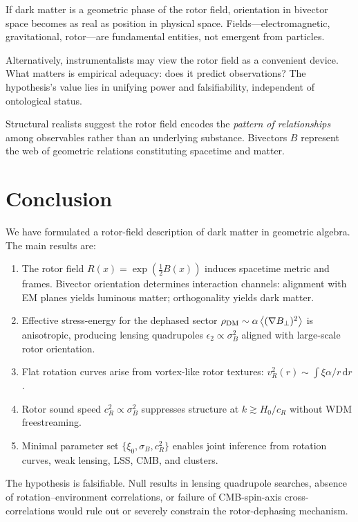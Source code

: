 \documentclass[11pt,a4paper]{article}
\numberwithin{equation}{section}
\theoremstyle{plain}
\theoremstyle{definition}
\theoremstyle{remark}
\newcommand{\dd}{\mathrm{d}}
\newcommand{\avg}[1]{\left\langle #1 \right\rangle}
\begin{document}
If dark matter is a geometric phase of the rotor field, orientation in bivector space becomes as real as position in physical space. Fields---electromagnetic, gravitational, rotor---are fundamental entities, not emergent from particles.

Alternatively, instrumentalists may view the rotor field as a convenient device. What matters is empirical adequacy: does it predict observations? The hypothesis's value lies in unifying power and falsifiability, independent of ontological status.

Structural realists suggest the rotor field encodes the \emph{pattern of relationships} among observables rather than an underlying substance. Bivectors $B$ represent the web of geometric relations constituting spacetime and matter.

\vspace{1em}

\section{Conclusion}\label{sec:conclusion}

We have formulated a rotor-field description of dark matter in geometric algebra. The main results are:

\begin{enumerate}[leftmargin=*]
  \item The rotor field $R(x)=\exp(\tfrac12 B(x))$ induces spacetime metric and frames. Bivector orientation determines interaction channels: alignment with EM planes yields luminous matter; orthogonality yields dark matter.
  \item Effective stress-energy for the dephased sector $\rho_{\rm DM}\sim\alpha\avg{(\nabla B_\perp)^2}$ is anisotropic, producing lensing quadrupoles $\epsilon_2\propto\sigma_B^2$ aligned with large-scale rotor orientation.
  \item Flat rotation curves arise from vortex-like rotor textures: $v_R^2(r)\sim \int \xi\alpha/r\,\dd r$.
  \item Rotor sound speed $c_R^2\propto\sigma_B^2$ suppresses structure at $k\gtrsim H_0/c_R$ without WDM freestreaming.
  \item Minimal parameter set $\{\xi_0,\sigma_B,c_R^2\}$ enables joint inference from rotation curves, weak lensing, LSS, CMB, and clusters.
\end{enumerate}

The hypothesis is falsifiable. Null results in lensing quadrupole searches, absence of rotation--environment correlations, or failure of CMB-spin-axis cross-correlations would rule out or severely constrain the rotor-dephasing mechanism.
\end{document}
